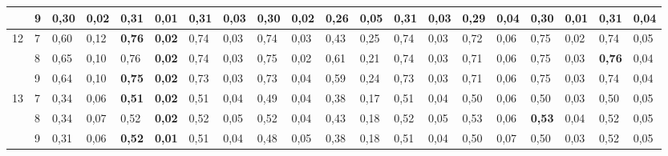 \documentclass[conference]{IEEEtran}
\begin{document}
\begin{table}[]
\begin{tabular}{|cl|ll|ll|ll|ll|ll|ll|ll|ll|ll|}
		\multicolumn{1}{|c|}{} & 9 & \multicolumn{1}{l|}{0,30} & 0,02 & \multicolumn{1}{l|}{0,31} & \textbf{0,01} & \multicolumn{1}{l|}{\textbf{0,31}} & 0,03 & \multicolumn{1}{l|}{0,30} & 0,02 & \multicolumn{1}{l|}{0,26} & 0,05 & \multicolumn{1}{l|}{\textbf{0,31}} & 0,03 & \multicolumn{1}{l|}{0,29} & 0,04 & \multicolumn{1}{l|}{0,30} & 0,01 & \multicolumn{1}{l|}{0,31} & 0,04 \\ \hline
		\multicolumn{1}{|c|}{\multirow{3}{*}{12}} & 7 & \multicolumn{1}{l|}{0,60} & 0,12 & \multicolumn{1}{l|}{\textbf{0,76}} & \textbf{0,02} & \multicolumn{1}{l|}{0,74} & 0,03 & \multicolumn{1}{l|}{0,74} & 0,03 & \multicolumn{1}{l|}{0,43} & 0,25 & \multicolumn{1}{l|}{0,74} & 0,03 & \multicolumn{1}{l|}{0,72} & 0,06 & \multicolumn{1}{l|}{0,75} & 0,02 & \multicolumn{1}{l|}{0,74} & 0,05 \\ \cline{2-20} 
		\multicolumn{1}{|c|}{} & 8 & \multicolumn{1}{l|}{0,65} & 0,10 & \multicolumn{1}{l|}{0,76} & \textbf{0,02} & \multicolumn{1}{l|}{0,74} & 0,03 & \multicolumn{1}{l|}{0,75} & 0,02 & \multicolumn{1}{l|}{0,61} & 0,21 & \multicolumn{1}{l|}{0,74} & 0,03 & \multicolumn{1}{l|}{0,71} & 0,06 & \multicolumn{1}{l|}{0,75} & 0,03 & \multicolumn{1}{l|}{\textbf{0,76}} & 0,04 \\ \cline{2-20} 
		\multicolumn{1}{|c|}{} & 9 & \multicolumn{1}{l|}{0,64} & 0,10 & \multicolumn{1}{l|}{\textbf{0,75}} & \textbf{0,02} & \multicolumn{1}{l|}{0,73} & 0,03 & \multicolumn{1}{l|}{0,73} & 0,04 & \multicolumn{1}{l|}{0,59} & 0,24 & \multicolumn{1}{l|}{0,73} & 0,03 & \multicolumn{1}{l|}{0,71} & 0,06 & \multicolumn{1}{l|}{0,75} & 0,03 & \multicolumn{1}{l|}{0,74} & 0,04 \\ \hline
		\multicolumn{1}{|c|}{\multirow{3}{*}{13}} & 7 & \multicolumn{1}{l|}{0,34} & 0,06 & \multicolumn{1}{l|}{\textbf{0,51}} & \textbf{0,02} & \multicolumn{1}{l|}{0,51} & 0,04 & \multicolumn{1}{l|}{0,49} & 0,04 & \multicolumn{1}{l|}{0,38} & 0,17 & \multicolumn{1}{l|}{0,51} & 0,04 & \multicolumn{1}{l|}{0,50} & 0,06 & \multicolumn{1}{l|}{0,50} & 0,03 & \multicolumn{1}{l|}{0,50} & 0,05 \\ \cline{2-20} 
		\multicolumn{1}{|c|}{} & 8 & \multicolumn{1}{l|}{0,34} & 0,07 & \multicolumn{1}{l|}{0,52} & \textbf{0,02} & \multicolumn{1}{l|}{0,52} & 0,05 & \multicolumn{1}{l|}{0,52} & 0,04 & \multicolumn{1}{l|}{0,43} & 0,18 & \multicolumn{1}{l|}{0,52} & 0,05 & \multicolumn{1}{l|}{0,53} & 0,06 & \multicolumn{1}{l|}{\textbf{0,53}} & 0,04 & \multicolumn{1}{l|}{0,52} & 0,05 \\ \cline{2-20} 
		\multicolumn{1}{|c|}{} & 9 & \multicolumn{1}{l|}{0,31} & 0,06 & \multicolumn{1}{l|}{\textbf{0,52}} & \textbf{0,01} & \multicolumn{1}{l|}{0,51} & 0,04 & \multicolumn{1}{l|}{0,48} & 0,05 & \multicolumn{1}{l|}{0,38} & 0,18 & \multicolumn{1}{l|}{0,51} & 0,04 & \multicolumn{1}{l|}{0,50} & 0,07 & \multicolumn{1}{l|}{0,50} & 0,03 & \multicolumn{1}{l|}{0,52} & 0,05 \\ \hline

\end{tabular}
\end{table}
\end{document}
